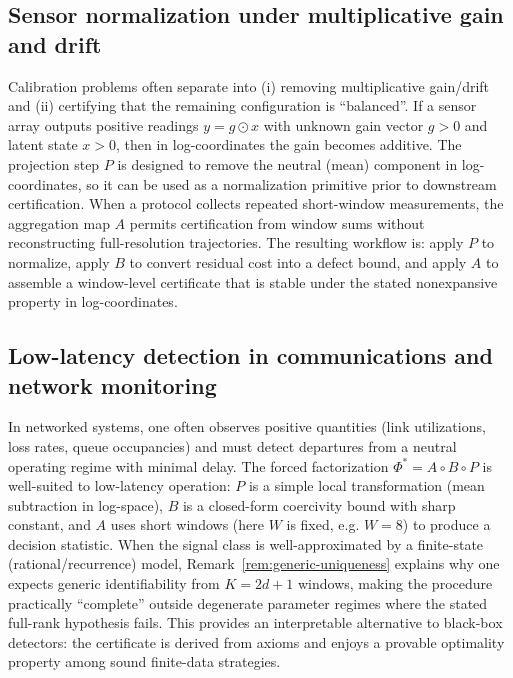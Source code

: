 \documentclass[11pt,reqno]{amsart}
\theoremstyle{definition}
\theoremstyle{remark}
\newcommand{\1}{\mathbf{1}}
\begin{document}
\subsection{Sensor normalization under multiplicative gain and drift}
Calibration problems often separate into (i) removing multiplicative gain/drift and (ii) certifying that
the remaining configuration is ``balanced''.
If a sensor array outputs positive readings $y=g\odot x$ with unknown gain vector $g>0$ and latent state $x>0$,
then in log-coordinates the gain becomes additive.
The projection step $P$ is designed to remove the neutral (mean) component in log-coordinates,
so it can be used as a normalization primitive prior to downstream certification.
When a protocol collects repeated short-window measurements, the aggregation map $A$
permits certification from window sums without reconstructing full-resolution trajectories.
The resulting workflow is: apply $P$ to normalize, apply $B$ to convert residual cost into a defect bound,
and apply $A$ to assemble a window-level certificate that is stable under the stated nonexpansive property
in log-coordinates.

\subsection{Low-latency detection in communications and network monitoring}
In networked systems, one often observes positive quantities (link utilizations, loss rates, queue occupancies)
and must detect departures from a neutral operating regime with minimal delay.
The forced factorization $\Phi^\ast=A\circ B\circ P$ is well-suited to low-latency operation:
$P$ is a simple local transformation (mean subtraction in log-space),
$B$ is a closed-form coercivity bound with sharp constant,
and $A$ uses short windows (here $W$ is fixed, e.g. $W=8$) to produce a decision statistic.
When the signal class is well-approximated by a finite-state (rational/recurrence) model,
Remark~\ref{rem:generic-uniqueness} explains why one expects generic identifiability from $K=2d+1$ windows,
making the procedure practically ``complete'' outside degenerate parameter regimes where the stated full-rank hypothesis fails.
This provides an interpretable alternative to black-box detectors: the certificate is derived from axioms and
enjoys a provable optimality property among sound finite-data strategies.
\end{document}

